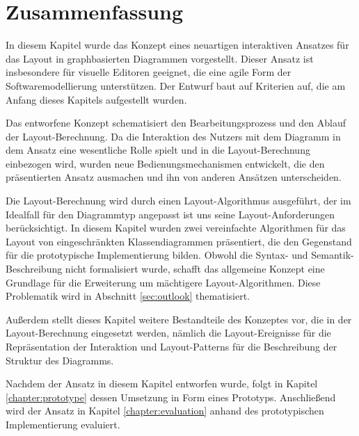 \section{Zusammenfassung}
\label{sec:approach-summary}

In diesem Kapitel wurde das Konzept eines neuartigen interaktiven Ansatzes für das Layout in graphbasierten Diagrammen vorgestellt. Dieser Ansatz ist insbesondere für visuelle Editoren geeignet, die eine agile Form der Softwaremodellierung unterstützen. Der Entwurf baut auf Kriterien auf, die am Anfang dieses Kapitels aufgestellt wurden.

Das entworfene Konzept schematisiert den Bearbeitungsprozess und den Ablauf der Layout-Berechnung. Da die Interaktion des Nutzers mit dem Diagramm in dem Ansatz eine wesentliche Rolle spielt und in die Layout-Berechnung einbezogen wird, wurden neue Bedienungsmechanismen entwickelt, die den präsentierten Ansatz ausmachen und ihn von anderen Ansätzen unterscheiden.

Die Layout-Berechnung wird durch einen Layout-Algorithmus ausgeführt, der im Idealfall für den Diagrammtyp angepasst ist uns seine Layout-Anforderungen berücksichtigt. In diesem Kapitel wurden zwei vereinfachte Algorithmen für das Layout von eingeschränkten Klassendiagrammen präsentiert, die den Gegenstand für die prototypische Implementierung bilden. Obwohl die Syntax- und Semantik-Beschreibung nicht formalisiert wurde, schafft das allgemeine Konzept eine Grundlage für die Erweiterung um mächtigere Layout-Algorithmen. Diese Problematik wird in Abschnitt \ref{sec:outlook} thematisiert.

Außerdem stellt dieses Kapitel weitere Bestandteile des Konzeptes vor, die in der Layout-Berechnung eingesetzt werden, nämlich die Layout-Ereignisse für die Repräsentation der Interaktion und Layout-Patterns für die Beschreibung der Struktur des Diagramms.

Nachdem der Ansatz in diesem Kapitel entworfen wurde, folgt in Kapitel \ref{chapter:prototype} dessen Umsetzung in Form eines Prototyps. Anschließend wird der Ansatz in Kapitel \ref{chapter:evaluation} anhand des prototypischen Implementierung evaluiert.
